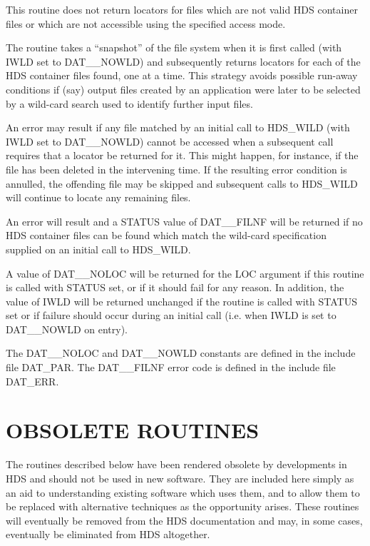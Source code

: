 \documentclass[twoside,11pt]{starlink}
\providecommand{\qt}[1]{``#1''}
\begin{document}
{{{         \sstitem
         This routine does not return locators for files which are not
         valid HDS container files or which are not accessible using the
         specified access mode.

         \sstitem
         The routine takes a \qt{snapshot} of the file system when it is
         first called (with IWLD set to DAT\_\_NOWLD) and subsequently
         returns locators for each of the HDS container files found, one
         at a time. This strategy avoids possible run-away conditions if
         (say) output files created by an application were later to be
         selected by a wild-card search used to identify further input
         files.

         \sstitem
         An error may result if any file matched by an initial call to
         HDS\_WILD (with IWLD set to DAT\_\_NOWLD) cannot be accessed when a
         subsequent call requires that a locator be returned for it. This
         might happen, for instance, if the file has been deleted in the
         intervening time. If the resulting error condition is annulled,
         the offending file may be skipped and subsequent calls to
         HDS\_WILD will continue to locate any remaining files.

         \sstitem
         An error will result and a STATUS value of DAT\_\_FILNF will be
         returned if no HDS container files can be found which match the
         wild-card specification supplied on an initial call to HDS\_WILD.

         \sstitem
         A value of DAT\_\_NOLOC will be returned for the LOC argument if
         this routine is called with STATUS set, or if it should fail for
         any reason. In addition, the value of IWLD will be returned
         unchanged if the routine is called with STATUS set or if failure
         should occur during an initial call (i.e. when IWLD is set to
         DAT\_\_NOWLD on entry).

         \sstitem
         The DAT\_\_NOLOC and DAT\_\_NOWLD constants are defined in the
         include file DAT\_PAR. The DAT\_\_FILNF error code is defined in the
         include file DAT\_ERR.
      }
   }
}
\normalsize

\newpage
\section{OBSOLETE ROUTINES}
The routines described below have been rendered obsolete by
developments in HDS and should not be used in new software. They are
included here simply as an aid to understanding existing software
which uses them, and to allow them to be replaced with alternative
techniques as the opportunity arises. These routines will eventually
be removed from the HDS documentation and may, in some cases,
eventually be eliminated from HDS altogether.
\end{document}
